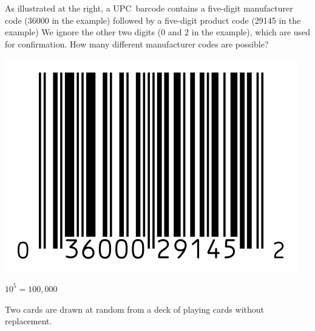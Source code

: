 \documentclass[answers,addpoints,12pt]{exam}
\begin{document}
\begin{questions}

\begin{multicols}{2}
\question[10]
As illustrated at the right,
a UPC~barcode contains
a five-digit manufacturer code (36000 in the example)
followed by a five-digit product code
(29145 in the example)
We ignore the other two digits
(0 and 2 in the example), which are used for confirmation.
How many different
manufacturer codes are possible?
\break\\
\begin{center}\includegraphics[scale=.5]{Barcode}\end{center}
\end{multicols}
\begin{solution}$10^5=100,000$\end{solution}

\question[16] Two cards are drawn at random from a deck of playing cards
without replacement.


\end{questions}
\end{document}

